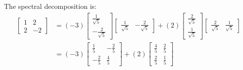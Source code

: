 \documentclass{article}
\theoremstyle{mystyle}
\begin{document}
The spectral decomposition is:
\begin{align*}
  \begin{bmatrix}1&2\\2&-2\end{bmatrix}
  &= (-3)\begin{bmatrix}\tfrac{1}{\sqrt5}\\-\tfrac{2}{\sqrt5}\end{bmatrix}
         \begin{bmatrix}\tfrac{1}{\sqrt5}&-\tfrac{2}{\sqrt5}\end{bmatrix}
   + (2)\begin{bmatrix}\tfrac{2}{\sqrt5}\\\tfrac{1}{\sqrt5}\end{bmatrix}
         \begin{bmatrix}\tfrac{2}{\sqrt5}&\tfrac{1}{\sqrt5}\end{bmatrix}\\[6pt]
  &= (-3)\begin{bmatrix}\tfrac{1}{5}&-\tfrac{2}{5}\\-\tfrac{2}{5}&\tfrac{4}{5}\end{bmatrix}
   + (2)\begin{bmatrix}\tfrac{4}{5}&\tfrac{2}{5}\\\tfrac{2}{5}&\tfrac{1}{5}\end{bmatrix}
  \tag{8}
\end{align*}
\end{document}
